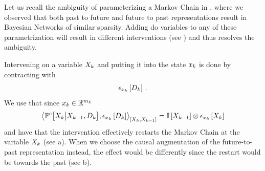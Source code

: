 \begin{example}\label{exa:mcIntervention}

    Let us recall the ambiguity of parameterizing a Markov Chain in , where we observed that both past to future and future to past representations result in Bayesian Networks of similar sparsity.
    Adding do variables to any of these parametrization will result in different interventions (see ) and thus resolves the ambiguity.

    Intervening on a variable $X_{k}$ and putting it into the state $x_{k}$ is done by contracting with
    \begin{align*}
        \epsilon_{x_{k}}\left[D_{k}\right] \, .
    \end{align*}
    We use that since $x_{k}\in\mathbb{R}^{m_{k}}$
    \begin{align*}
        \left\langle \mathbb{P}^{c}\big[X_{k}\big|X_{k-1},D_{k}\big], \epsilon_{x_{k}}\left[D_{k}\right] \right\rangle_{\left[ 
            X_{k},X_{k-1}
         \right]}
        = \mathbb{I}\left[X_{k-1}\right]
        \otimes  \epsilon_{x_{k}}\left[X_{k}\right]
    \end{align*}
    and have that the intervention effectively restarts the Markov Chain at the variable $X_{k}$ (see a).
    When we choose the causal augmentation of the future-to-past representation instead, the effect would be differently since the restart would be towards the past (see b).


    \begin{figure}
\end{figure}
\end{example}
